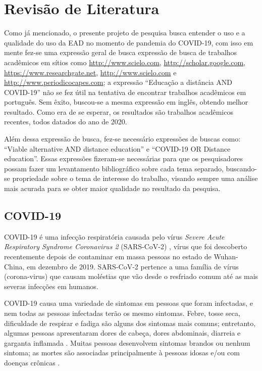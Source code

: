 \documentclass[
	arial,
	12pt,				%
	openright,			%
	twoside,			%
	a4paper,			%
	chapter=TITLE,		%
	english,			%
	french,				%
	spanish,			%
	brazil,				%
	]{abntex2}
\begin{document}
\chapter{Revisão de Literatura}

Como já mencionado, o presente projeto de pesquisa busca entender o uso e a qualidade do uso da EAD no momento de pandemia do COVID-19, com isso em mente fez-se uma expressão geral de busca expressão de busca de trabalhos acadêmicos em sítios como \url{http://www.scielo.com}, \url{http://scholar.google.com}, \url{https://www.researchgate.net}, \url{http://www.scielo.com} e \url{http://www.periodicocapes.com}; a expressão ``Educação a distância AND COVID-19'' não se fez útil na tentativa de encontrar trabalhos acadêmicos em português. Sem êxito, buscou-se a mesma expressão em inglês, obtendo melhor resultado. Como era de se esperar, os resultados são trabalhos acadêmicos recentes, todos datados do ano de 2020.  

Além dessa expressão de busca, fez-se necessário expressões de buscas como: ``Viable alternative AND distance education'' e ``COVID-19 OR Distance education''. Essas expressões fizeram-se necessárias para que os pesquisadores possam fazer um levantamento bibliográfico sobre cada tema separado, buscando-se propriedade sobre o tema de interesse do trabalho, visando sempre uma análise mais acurada para se obter maior qualidade no resultado da pesquisa.

\section{COVID-19}

COVID-19 é uma infecção respiratória causada pelo vírus \textit{Severe Acute Respiratory Syndrome Coronavirus 2} (SARS-CoV-2) \cite{desai2020stopping}, vírus que foi descoberto recentemente depois de contaminar em massa pessoas no estado de Wuhan-China, em dezembro de 2019. SARS-CoV-2 pertence a uma família de vírus (corona-virus) que causam moléstias que vão desde o resfriado comum até as mais severas infecções em humanos.

COVID-19 causa uma variedade de sintomas em pessoas que foram infectadas, e nem todas as pessoas infectadas terão os mesmo sintomas. Febre, tosse seca, dificuldade de respirar e fadiga são alguns dos sintomas mais comuns; entretanto, algumas pessoas apresentaram dores de cabeça, dores abdominais, diarreia e garganta inflamada \cite{desai2020stopping}. Muitas pessoas desenvolvem sintomas brandos ou nenhum sintoma; as mortes são associadas principalmente à pessoas idosas e/ou com doenças crônicas \cite{watkins2020preventing}. 
\end{document}
